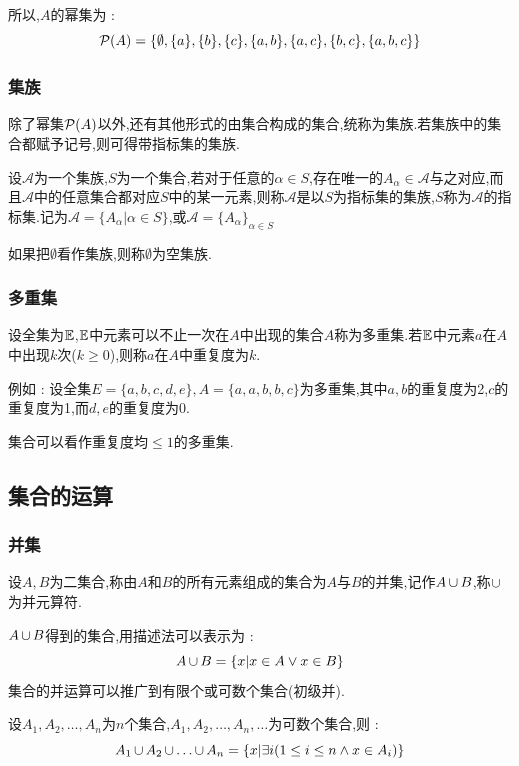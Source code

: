 {{{{  所以,$A$的幂集为 : $$
    \operatorname{\mathcal{P}} (A) = \{\emptyset,\{a\},\{b\},\{c\},\{a,b\},\{a,c\},\{b,c\},\{a,b,c\}\}
  $$
}%

\subsubsection{集族}{
除了幂集$\operatorname{\mathcal{P}} (A)$以外,还有其他形式的由集合构成的集合,统称为集族.若集族中的集合都赋予记号,则可得带指标集的集族.

设$\mathcal{A}$为一个集族,$S$为一个集合,若对于任意的$\alpha \in S$,存在唯一的$A_\alpha \in \mathcal{A}$与之对应,而且$\mathcal{A}$中的任意集合都对应$S$中的某一元素,则称$\mathcal{A}$是以$S$为指标集的集族,$S$称为$\mathcal{A}$的指标集.记为$\mathcal{A} = \{A_\alpha | \alpha \in S\}$,或$\mathcal{A} = \{A_\alpha\}_{\alpha \in S}$

如果把$\emptyset$看作集族,则称$\emptyset$为空集族.
}%

\subsubsection{多重集}{
  设全集为$\operatorname{\mathbb{E}}$,$\operatorname{\mathbb{E}}$中元素可以不止一次在$A$中出现的集合$A$称为多重集.若$\operatorname{\mathbb{E}}$中元素$a$在$A$中出现$k$次($k \geq 0$),则称$a$在$A$中重复度为$k$.

  例如 : 设全集$E = \{a,b,c,d,e\},A = \{a,a,b,b,c\}$为多重集,其中$a,b$的重复度为2,$c$的重复度为1,而$d,e$的重复度为0.

  集合可以看作重复度均$\leq 1$的多重集.
}%

}%

\subsection{集合的运算}{

  \subsubsection{并集}{
    设$A,B$为二集合,称由$A$和$B$的所有元素组成的集合为$A$与$B$的并集,记作$A \operatorname{\cup} B$,称$\operatorname{\cup}$为并元算符.

    $A \operatorname{\cup} B$得到的集合,用描述法可以表示为 : $$
      A \operatorname{\cup} B = \{x | x \in A \lor x \in B\}
    $$
    集合的并运算可以推广到有限个或可数个集合(初级并).

    设$A_1,A_2,\dots,A_n$为$n$个集合,$A_1,A_2,\dots,A_n,\dots$为可数个集合,则 : $$
      A_1 \operatorname{\cup} A_2 \operatorname{\cup} \dots \operatorname{\cup} A_n = \{x | \exists i (1 \leq i \leq n \land x \in A_i)\}
    $$

}}}}
